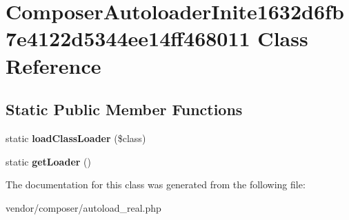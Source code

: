 \hypertarget{classComposerAutoloaderInite1632d6fb7e4122d5344ee14ff468011}{\section{Composer\+Autoloader\+Inite1632d6fb7e4122d5344ee14ff468011 Class Reference}
\label{classComposerAutoloaderInite1632d6fb7e4122d5344ee14ff468011}
}
\subsection*{Static Public Member Functions}
\begin{DoxyCompactItemize}
\item 
\hypertarget{classComposerAutoloaderInite1632d6fb7e4122d5344ee14ff468011_a3f08e981515062f9bb3c8f967ee9f7f3}{static {\bfseries load\+Class\+Loader} (\$class)}\label{classComposerAutoloaderInite1632d6fb7e4122d5344ee14ff468011_a3f08e981515062f9bb3c8f967ee9f7f3}

\item 
\hypertarget{classComposerAutoloaderInite1632d6fb7e4122d5344ee14ff468011_ac516309360163b5f879c072bf7e102c4}{static {\bfseries get\+Loader} ()}\label{classComposerAutoloaderInite1632d6fb7e4122d5344ee14ff468011_ac516309360163b5f879c072bf7e102c4}

\end{DoxyCompactItemize}


The documentation for this class was generated from the following file\+:\begin{DoxyCompactItemize}
\item 
vendor/composer/autoload\+\_\+real.\+php\end{DoxyCompactItemize}
